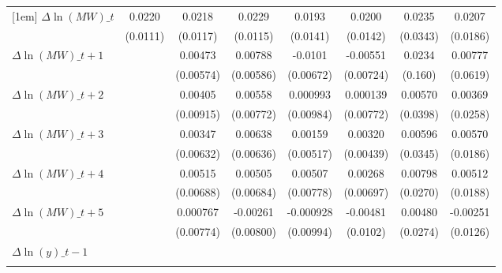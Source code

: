 {\begin{tabular}{l*{7}{c}}
[1em]
$\Delta \ln(MW)\_{t}$&   0.0220\sym{*}  &   0.0218\sym{*}  &   0.0229\sym{*}  &   0.0193         &   0.0200         &   0.0235         &   0.0207         \\
          & (0.0111)         & (0.0117)         & (0.0115)         & (0.0141)         & (0.0142)         & (0.0343)         & (0.0186)         \\
[1em]
$\Delta \ln(MW)\_{t+1}$&                  &  0.00473         &  0.00788         &  -0.0101         & -0.00551         &   0.0234         &  0.00777         \\
          &                  &(0.00574)         &(0.00586)         &(0.00672)         &(0.00724)         &  (0.160)         & (0.0619)         \\
[1em]
$\Delta \ln(MW)\_{t+2}$&                  &  0.00405         &  0.00558         & 0.000993         & 0.000139         &  0.00570         &  0.00369         \\
          &                  &(0.00915)         &(0.00772)         &(0.00984)         &(0.00772)         & (0.0398)         & (0.0258)         \\
[1em]
$\Delta \ln(MW)\_{t+3}$&                  &  0.00347         &  0.00638         &  0.00159         &  0.00320         &  0.00596         &  0.00570         \\
          &                  &(0.00632)         &(0.00636)         &(0.00517)         &(0.00439)         & (0.0345)         & (0.0186)         \\
[1em]
$\Delta \ln(MW)\_{t+4}$&                  &  0.00515         &  0.00505         &  0.00507         &  0.00268         &  0.00798         &  0.00512         \\
          &                  &(0.00688)         &(0.00684)         &(0.00778)         &(0.00697)         & (0.0270)         & (0.0188)         \\
[1em]
$\Delta \ln(MW)\_{t+5}$&                  & 0.000767         & -0.00261         &-0.000928         & -0.00481         &  0.00480         & -0.00251         \\
          &                  &(0.00774)         &(0.00800)         &(0.00994)         & (0.0102)         & (0.0274)         & (0.0126)         \\
[1em]
$\Delta \ln(y)\_{t-1}$&                  &                  &                  &                  &                  &                  &                  \\
          &                  &                  &                  &                  &                  &                  &                  \\

\end{tabular}}
